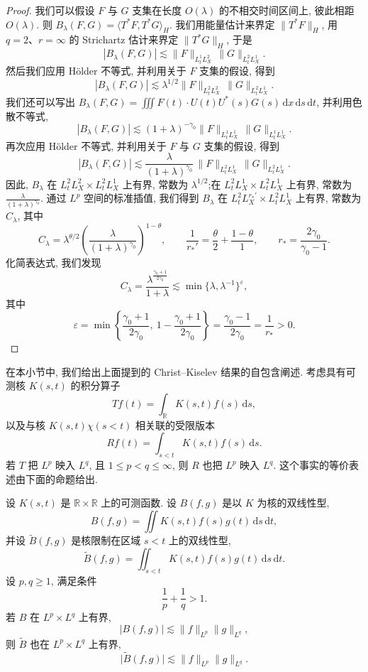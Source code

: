 \begin{proof}
我们可以假设 $F$ 与 $G$ 支集在长度 $O(\lambda)$ 的不相交时间区间上, 彼此相距 $O(\lambda)$. 则 $B_{\lambda}(F, G)=\langle T^{*}F, T^{*}G\rangle_H$. 我们用能量估计来界定 $\|T^{*}F\|_H$, 用 $q=2$、$r=\infty$ 的 Strichartz 估计来界定 $\|T^{*}G\|_H$, 于是
\[
|B_{\lambda}(F, G)|\lesssim\|F\|_{L_t^1 L_X^2}\, \|G\|_{L_t^2 L_X^1}.
\]
然后我们应用 Hölder 不等式, 并利用关于 $F$ 支集的假设, 得到
\[
|B_{\lambda}(F, G)|\lesssim\lambda^{1/2}\|F\|_{L_t^2 L_X^2}\, \|G\|_{L_t^2 L_X^1}.
\]
我们还可以写出 $B_{\lambda}(F, G)=\iiint F(t)\cdot U(t)U^{*}(s)G(s)\, \mathrm{d}x\, \mathrm{d}s\, \mathrm{d}t$, 并利用色散不等式, 
\[
|B_{\lambda}(F, G)|\lesssim(1+\lambda)^{-\gamma_0}\|F\|_{L_t^1 L_X^1}\, \|G\|_{L_t^1 L_X^1}.
\]
再次应用 Hölder 不等式, 并利用关于 $F$ 与 $G$ 支集的假设, 得到
\[
|B_{\lambda}(F, G)|\lesssim\frac{\lambda}{(1+\lambda)^{\gamma_0}}\, \|F\|_{L_t^2 L_X^1}\, \|G\|_{L_t^2 L_X^1}.
\]
因此, $B_{\lambda}$ 在 $L_t^2 L_X^2\times L_t^2 L_X^1$ 上有界, 常数为 $\lambda^{1/2}$;在 $L_t^2 L_X^1\times L_t^2 L_X^1$ 上有界, 常数为 $\frac{\lambda}{(1+\lambda)^{\gamma_0}}$. 通过 $L^p$ 空间的标准插值, 我们得到 $B_{\lambda}$ 在 $L_t^2 L_X^{r_{*}'}\times L_t^2 L_X^1$ 上有界, 常数为 $C_{\lambda}$, 其中
\[
C_{\lambda}=\lambda^{\theta/2}\left(\frac{\lambda}{(1+\lambda)^{\gamma_0}}\right)^{1-\theta}, \qquad
\frac{1}{r_{*}'}=\frac{\theta}{2}+\frac{1-\theta}{1}, \qquad
r_{*}=\frac{2\gamma_0}{\gamma_0-1}.
\]
化简表达式, 我们发现
\[
C_{\lambda}=\frac{\lambda^{\frac{\gamma_0+1}{2\gamma_0}}}{1+\lambda}\lesssim\min\bigl\{\lambda, \lambda^{-1}\bigr\}^{\varepsilon}, 
\]
其中
\[
\varepsilon=\min\left\{\frac{\gamma_0+1}{2\gamma_0}, \ 1-\frac{\gamma_0+1}{2\gamma_0}\right\}
=\frac{\gamma_0-1}{2\gamma_0}=\frac{1}{r_{*}}>0 .
\]
\end{proof}


在本小节中, 我们给出上面提到的 Christ--Kiselev 结果的自包含阐述. 考虑具有可测核 $K(s, t)$ 的积分算子
\[
Tf(t)=\int_{\mathbb{R}}K(s, t)f(s)\, \mathrm{d}s, 
\]
以及与核 $K(s, t)\chi(s<t)$ 相关联的受限版本
\[
Rf(t)=\int_{s<t}K(s, t)f(s)\, \mathrm{d}s .
\]
若 $T$ 把 $L^p$ 映入 $L^q$, 且 $1\leq p<q\leq\infty$, 则 $R$ 也把 $L^p$ 映入 $L^q$. 这个事实的等价表述由下面的命题给出. 

\setcounter{mtthm}{56}

\begin{proposition}\label{prop:c8-0.57}
设 $K(s, t)$ 是 $\mathbb{R}\times\mathbb{R}$ 上的可测函数. 设 $B(f, g)$ 是以 $K$ 为核的双线性型, 
\[
B(f, g)=\iint K(s, t)f(s)g(t)\, \mathrm{d}s\, \mathrm{d}t, 
\]
并设 $\widetilde{B}(f, g)$ 是核限制在区域 $s<t$ 上的双线性型, 
\[
\widetilde{B}(f, g)=\iint_{s<t}K(s, t)f(s)g(t)\, \mathrm{d}s\, \mathrm{d}t .
\]
设 $p, q\geq1$, 满足条件
\begin{equation}
\frac{1}{p}+\frac{1}{q}>1.\label{eq:c8-381}
\end{equation}
若 $B$ 在 $L^p\times L^q$ 上有界, 
\[
|B(f, g)|\lesssim\|f\|_{L^p}\|g\|_{L^q}, 
\]
则 $\widetilde{B}$ 也在 $L^p\times L^q$ 上有界, 
\[
\bigl|\widetilde{B}(f, g)\bigr|\lesssim\|f\|_{L^p}\|g\|_{L^q}.
\]
\end{proposition}

